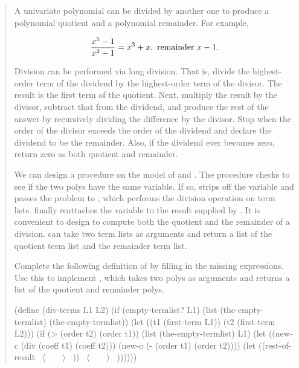 \begin{quote}
 A univariate polynomial can be
divided by another one to produce a polynomial quotient and a polynomial
remainder.  For example,
\begin{comment}

\begin{example}
x^5 - 1
------- = x^3 + x, remainder x - 1
x^2 - 1
\end{example}

\end{comment}

$$ {x^5 - 1 \over x^2 - 1} = x^3 + x, \hbox{  remainder  } x - 1. $$

Division can be performed via long division.  That is, divide the highest-order
term of the dividend by the highest-order term of the divisor.  The result is
the first term of the quotient.  Next, multiply the result by the divisor,
subtract that from the dividend, and produce the rest of the answer by
recursively dividing the difference by the divisor.  Stop when the order of the
divisor exceeds the order of the dividend and declare the dividend to be the
remainder.  Also, if the dividend ever becomes zero, return zero as both
quotient and remainder.

We can design a  procedure on the model of  and
. The procedure checks to see if the two polys have the same
variable.  If so,  strips off the variable and passes the
problem to , which performs the division operation on term
lists.  finally reattaches the variable to the result supplied
by .  It is convenient to design  to compute
both the quotient and the remainder of a division.   can take
two term lists as arguments and return a list of the quotient term list and the
remainder term list.

Complete the following definition of  by filling in the missing
expressions.  Use this to implement , which takes two polys as
arguments and returns a list of the quotient and remainder polys.

\begin{smallscheme}
(define (div-terms L1 L2)
  (if (empty-termlist? L1)
      (list (the-empty-termlist) (the-empty-termlist))
      (let ((t1 (first-term L1))
            (t2 (first-term L2)))
        (if (> (order t2) (order t1))
            (list (the-empty-termlist) L1)
            (let ((new-c (div (coeff t1) (coeff t2)))
                  (new-o (- (order t1) (order t2))))
              (let ((rest-of-result
                     ~\( \langle \)~~~~\( \rangle \)~ ))
                ~\( \langle \)~~~~\( \rangle \)~ ))))))
\end{smallscheme}
\end{quote}

